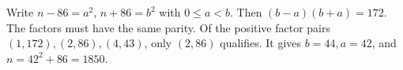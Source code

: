 Write $n-86=a^2$, $n+86=b^2$ with $0\le a<b$. Then $(b-a)(b+a)=172$. The factors must have the same parity. Of the positive factor pairs $(1,172),(2,86),(4,43)$, only $(2,86)$ qualifies. It gives $b=44,a=42$, and $n=42^2+86=\boxed{1850}$.
